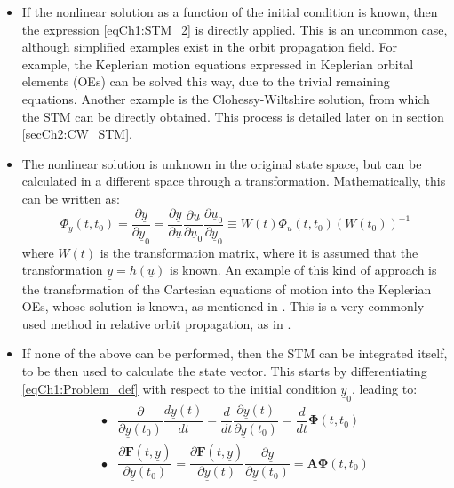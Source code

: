 	\begin{itemize}
	\item[\GMVred{A.}] If the nonlinear solution as a function of the initial condition is known, then the expression \eqref{eqCh1:STM_2} is directly applied. This is an uncommon case, although simplified examples exist in the orbit propagation field. For example, the Keplerian motion equations expressed in Keplerian orbital elements (OEs) can be solved this way, due to the trivial remaining equations. Another example is the Clohessy-Wiltshire solution, from which the STM can be directly obtained. This process is detailed later on in section \ref{secCh2:CW_STM}.
	\item[\GMVred{B.}] The nonlinear solution is unknown in the original state space, but can be calculated in a different space through a transformation. Mathematically, this can be written as:
	\begin{equation}
	\Phi_{y} (t, t_0) = \dfrac{\partial \underline{y}}{\partial \underline{y}_0} = \dfrac{\partial \underline{y}}{\partial \underline{u}} \dfrac{\partial \underline{u}}{\partial \underline{u}_0} \dfrac{\partial
	\underline{u}_0}{\partial \underline{y}_0} \equiv W(t) \Phi_u(t, t_0) \left( W(t_0) \right)^{-1}
	\label{eqCh1:STM_decomp}
	\end{equation}
	\noindent where $W(t)$ is the transformation matrix, where it is assumed that the transformation $\underline{y} = h(\underline{u})$ is known. An example of this kind of approach is the transformation of the Cartesian equations of motion into the Keplerian OEs, whose solution is known, as mentioned in . This is a very commonly used method in relative orbit propagation, as in \cite{Yamanaka_Ankersen, GA_STM}.
	\item[\GMVred{C.}] If none of the above can be performed, then the STM can be integrated itself, to be then used to calculate the state vector. This starts by differentiating \eqref{eqCh1:Problem_def} with respect to the initial condition $\underline{y}_0$, leading to:
	\[
	\begin{array}{ll}
	\bullet & \dfrac{\partial}{{\partial \underline{y}(t_0)}} \dfrac{d\underline{y}(t)}{dt} = \dfrac{d}{dt}\dfrac{\partial \underline{y}(t)} {{\partial \underline{y}(t_0)}} = \dfrac{d}{dt} \bm \Phi (t, t_0) \\[1.2em]
	\bullet & \dfrac{\partial \bm F(t, \underline{y})}{{\partial \underline{y}(t_0)}}  = \dfrac{\partial \bm F(t, \underline{y})}{{\partial \underline{y}(t)}} \dfrac{\partial \underline{y}}{{\partial \underline{y}(t_0)}} = \bm A \bm \Phi(t, t_0)

\end{array}\]
\end{itemize}
